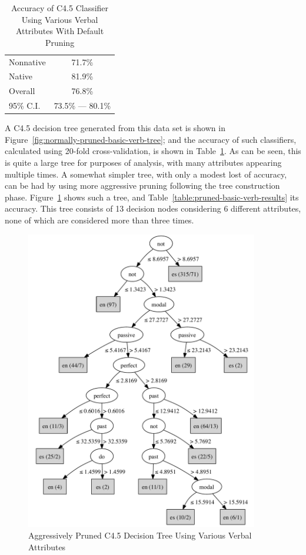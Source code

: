 \documentclass[main.tex]{subfiles}
\begin{document}
\begin{table}[htbp]
\centering
\caption{Accuracy of C4.5 Classifier Using Various Verbal Attributes With Default Pruning}
\begin{tabular}{l c}
\toprule
Nonnative & 71.7\% \\
Native & 81.9\% \\
Overall & 76.8\% \\
95\% C.I. & 73.5\% --- 80.1\%\\
\bottomrule
\end{tabular}
\label{table:normally-pruned-basic-verb-results}
\end{table}

A C4.5 decision tree generated from this data set is shown in Figure~\ref{fig:normally-pruned-basic-verb-tree}; and the accuracy of such classifiers, calculated using 20-fold cross-validation, is shown in Table~\ref{table:normally-pruned-basic-verb-results}. As can be seen, this is quite a large tree for purposes of analysis, with many attributes appearing multiple times. A somewhat simpler tree, with only a modest lost of accuracy, can be had by using more aggressive pruning following the tree construction phase. Figure~\ref{fig:pruned-basic-verb-tree} shows such a tree, and Table~\ref{table:pruned-basic-verb-results} its accuracy. This tree consists of 13 decision nodes considering 6 different attributes, none of which are considered more than three times.
\begin{figure}[htbp]
\centering
\includegraphics[width=4in]{pruned-basic-verb-tree.pdf}
\caption{Aggressively Pruned C4.5 Decision Tree Using Various Verbal Attributes}
\label{fig:pruned-basic-verb-tree}
\end{figure}
\end{document}
